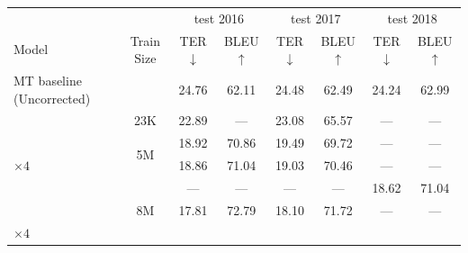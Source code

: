 \begin{table}[t]
  \small
  \centering
  \begin{tabular}{lccccccc}
    \toprule
                                                     &                & \multicolumn{2}{c}{test 2016} &
    \multicolumn{2}{c}{test 2017}                    &
    \multicolumn{2}{c}{test 2018}                                                                                                      \\
    \cmidrule{3-4} \cmidrule{5-6}  \cmidrule{7-8}
    Model                                            & Train Size     & TER$\downarrow$               & BLEU$\uparrow$ &
    TER$\downarrow$                                  & BLEU$\uparrow$ & TER$\downarrow$               & BLEU$\uparrow$                 \\
    \midrule
    MT baseline (Uncorrected)                        &                &
    24.76                                            & 62.11          & 24.48                         & 62.49          & 24.24 & 62.99 \\
    \midrule
    \citet{berard2017lig}                            &
    \multicolumn{1}{c}{23K}                          &
    22.89                                            & ---            & 23.08                         & 65.57          & ---   & ---   \\
    \midrule
    \citet{junczys2018ms}                            &
    \multicolumn{1}{c}{\multirow{2}{*}{5M}}          &
    18.92                                            & 70.86          & 19.49                         & 69.72          & ---   & ---   \\
    \citet{junczys2018ms}$\times 4$                  &
    \multicolumn{1}{c}{}                             &
    18.86                                            & 71.04          & 19.03                         & 70.46          & ---   & ---   \\
    \midrule
    \citet{tebbifakhr2018multi}                      &
    \multicolumn{1}{c}{\multirow{3}{*}{8M}}          &
    ---                                              & ---            & ---                           & ---            & 18.62 & 71.04 \\
    \citet{junczys2018ms}                            &
    \multicolumn{1}{c}{}                             &
    17.81                                            & 72.79          & 18.10                         & 71.72          & ---   & ---   \\
    \citet{junczys2018ms}$\times 4$                  &

\end{tabular}
\end{table}
